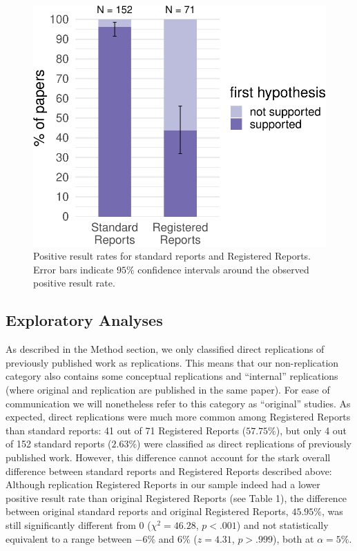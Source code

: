 \documentclass[british,,jou,floatsintext]{apa6}
\begin{document}
\begin{figure}
\centering
\includegraphics{positive_results_SRs_RRs_files/figure-latex/mainplot-1.pdf}
\caption{\label{fig:mainplot}Positive result rates for standard reports and Registered Reports. Error bars indicate \(95 \%\) confidence intervals around the observed positive result rate.}
\end{figure}

\hypertarget{exploratory-analyses}{%
\subsection{Exploratory Analyses}\label{exploratory-analyses}}

As described in the Method section, we only classified direct replications of previously published work as replications.
This means that our non-replication category also contains some conceptual replications and \enquote{internal} replications (where original and replication are published in the same paper).
For ease of communication we will nonetheless refer to this category as \enquote{original} studies.
As expected, direct replications were much more common among Registered Reports than standard reports: 41 out of 71 Registered Reports (\(57.75\%\)), but only 4 out of 152 standard reports (\(2.63\%\)) were classified as direct replications of previously published work.
However, this difference cannot account for the stark overall difference between standard reports and Registered Reports described above:
Although replication Registered Reports in our sample indeed had a lower positive result rate than original Registered Reports (see Table 1), the difference between original standard reports and original Registered Reports, \(45.95\%\), was still significantly different from 0 (\(\chi^2 = 46.28\), \(p < .001\)) and not statistically equivalent to a range between \(-6\%\) and \(6\%\) (\(z = 4.31\), \(p > .999\)), both at \(\alpha = 5\%\).
\end{document}
